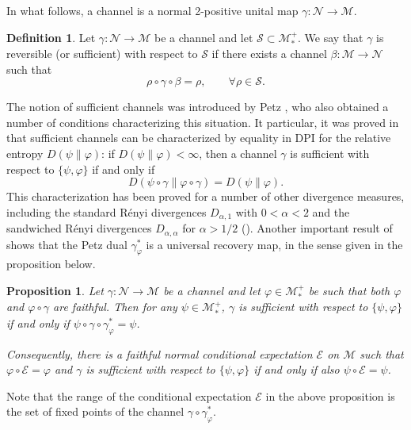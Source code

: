 \documentclass[12pt]{article}
\newtheorem{prop}[theorem]{Proposition}
\theoremstyle{definition}
\newtheorem{defi}[theorem]{Definition}
\theoremstyle{remark}
\numberwithin{equation}{section}
\def\Me{\mathcal M}
\def\Ne{\mathcal N}
\def\ffi{\varphi}
\begin{document}
In what follows, a channel is a normal 2-positive unital map $\gamma: \Ne\to \Me$.

\begin{defi} Let $\gamma:\Ne\to \Me$ be a channel and let $\mathcal S \subset
\Me_*^+$. We say that $\gamma$ is reversible (or sufficient) with respect to $\mathcal S$
if there exists a channel $\beta:\Me\to \Ne$ such that
\[
\rho\circ\gamma\circ\beta=\rho,\qquad \forall \rho\in \mathcal S.
\]

\end{defi}

The notion of sufficient channels was introduced by Petz
\cite{petz1986sufficient,petz1988sufficiency}, who also obtained a number of conditions
characterizing this situation. It particular, it was proved in \cite{petz1988sufficiency}
that sufficient channels can be characterized by equality in DPI for the relative entropy
$D(\psi\|\varphi)$: if $D(\psi\|\varphi)<\infty$, then a channel $\gamma$ is sufficient
with respect to $\{\psi,\varphi\}$ if and only if 
\[
D(\psi\circ\gamma\|\varphi\circ\gamma)=D(\psi\|\varphi). 
\]
This characterization has been proved for a number of other divergence measures, including the
standard R\'enyi divergences $D_{\alpha,1}$ with $0<\alpha<2$  and the sandwiched
R\'enyi divergences $D_{\alpha,\alpha}$ for $\alpha>1/2$
(\cite{hiai2021quantum,jencova2018renyi,jencova2021renyi}).
Another important result of \cite{petz1988sufficiency} shows that the Petz dual $\gamma_\varphi^*$ is a universal
recovery map, in the sense given in the proposition below. 

\begin{prop}\label{prop:universal} Let $\gamma:\Ne\to \Me$ be a channel and let
$\varphi\in \Me_*^+$ be such that both $\ffi$ and $\ffi\circ\gamma$ are faithful. Then for any $\psi\in \Me_*^+$, $\gamma$ is
sufficient with respect to $\{\psi,\varphi\}$ if and only if $\psi\circ\gamma\circ
\gamma_\varphi^*=\psi$.

Consequently, there is a faithful normal conditional expectation $\mathcal E$ on $\Me$
such that $\varphi\circ \mathcal E=\varphi$ and $\gamma$ is sufficient with respect to
$\{\psi,\varphi\}$ if and only if also $\psi\circ\mathcal E=\psi$.

\end{prop}

Note that the range of the conditional expectation $\mathcal E$ in the above proposition
is the set  of fixed points of the channel $\gamma\circ\gamma_\varphi^*$. 
\end{document}
